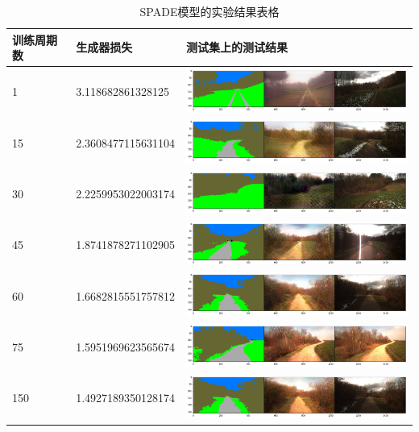 \documentclass[supercite]{HustGraduPaper}
\theoremstyle{definition}
\begin{document}
\begin{table}
  \begin{center}
  \begin{tabular}{|l|l|l|}\hline\hline
  训练周期数&生成器损失&测试集上的测试结果\\
  \hline
  1&3.118682861328125&\includegraphics[width=8cm]{images/spade-epoch-1}\\
  15&2.3608477115631104&\includegraphics[width=8cm]{images/spade-epoch-15}\\
  30&2.2259953022003174&\includegraphics[width=8cm]{images/spade-epoch-30}\\
  45&1.8741878271102905&\includegraphics[width=8cm]{images/spade-epoch-45}\\
  60&1.6682815551757812&\includegraphics[width=8cm]{images/spade-epoch-60}\\
  75&1.5951969623565674&\includegraphics[width=8cm]{images/spade-epoch-75}\\
  150&1.4927189350128174&\includegraphics[width=8cm]{images/spade-epoch-150}\\
  \hline\hline
  \end{tabular}
  \end{center}
  \caption{SPADE模型的实验结果表格}
  \label{experimental results on SPADE}
\end{table}
\end{document}
